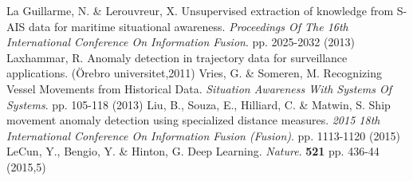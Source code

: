 La Guillarme, N. \& Lerouvreur, X. Unsupervised extraction of knowledge from S-AIS data for maritime situational awareness. {\em Proceedings Of The 16th International Conference On Information Fusion}. pp. 2025-2032 (2013)
Laxhammar, R. Anomaly detection in trajectory data for surveillance applications. (Örebro universitet,2011)
Vries, G. \& Someren, M. Recognizing Vessel Movements from Historical Data. {\em Situation Awareness With Systems Of Systems}. pp. 105-118 (2013)
Liu, B., Souza, E., Hilliard, C. \& Matwin, S. Ship movement anomaly detection using specialized distance measures. {\em 2015 18th International Conference On Information Fusion (Fusion)}. pp. 1113-1120 (2015)
LeCun, Y., Bengio, Y. \& Hinton, G. Deep Learning. {\em Nature}. \textbf{521} pp. 436-44 (2015,5)

